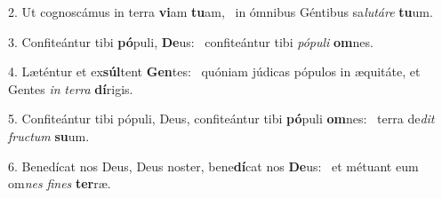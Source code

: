2. Ut cognoscámus in terra \textbf{vi}am \textbf{tu}am, \ast\  in ómnibus Géntibus sa\textit{lu}\textit{tá}\textit{re} \textbf{tu}um.\

3. Confiteántur tibi \textbf{pó}puli, \textbf{De}us: \ast\  confiteántur tibi \textit{pó}\textit{pu}\textit{li} \textbf{om}nes.\

4. Læténtur et ex\textbf{súl}tent \textbf{Gen}tes: \ast\  quóniam júdicas pópulos in æquitáte, et Gentes \textit{in} \textit{ter}\textit{ra} \textbf{dí}rigis.\

5. Confiteántur tibi pópuli, Deus, confiteántur tibi \textbf{pó}puli \textbf{om}nes: \ast\  terra de\textit{dit} \textit{fruc}\textit{tum} \textbf{su}um.\

6. Benedícat nos Deus, Deus noster, bene\textbf{dí}cat nos \textbf{De}us: \ast\  et métuant eum om\textit{nes} \textit{fi}\textit{nes} \textbf{ter}ræ.\

